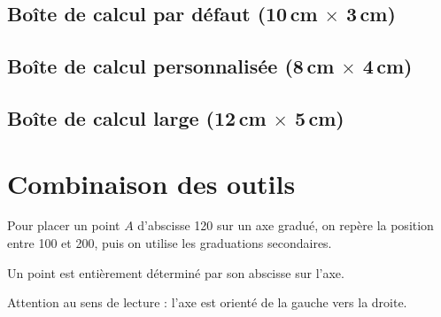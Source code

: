 \documentclass[11pt,a4paper]{article}
\begin{document}
\subsection{Boîte de calcul par défaut (10\,cm $\times$ 3\,cm)}

\begin{center}
\end{center}

\subsection{Boîte de calcul personnalisée (8\,cm $\times$ 4\,cm)}

\begin{center}
\end{center}

\subsection{Boîte de calcul large (12\,cm $\times$ 5\,cm)}

\begin{center}
\end{center}

\section{Combinaison des outils}

\begin{methode}
    Pour placer un point $A$ d'abscisse 120 sur un axe gradué, on
    repère la position entre 100 et 200, puis on utilise les graduations
    secondaires.
\end{methode}

\begin{center}
\axegradue[fin=400, pas=100, nombre=5, points={A/120/red, B/340/blue}]
\end{center}

\begin{retenir}
    Un point est entièrement déterminé par son abscisse sur l'axe.
\end{retenir}

\begin{vigilance}
    Attention au sens de lecture : l'axe est orienté de la gauche vers
    la droite.
\end{vigilance}
\end{document}
